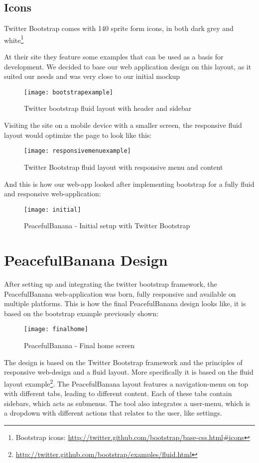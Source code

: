 \subsection{Icons}
Twitter Bootstrap comes with 140 sprite form icons, in both dark grey and white\footnote{Bootstrap icons: \url{http://twitter.github.com/bootstrap/base-css.html\#icons}} 

\newpage
At their site they feature some examples that can be used as a basis for development. We decided to base our web application design on this layout, as it suited our needs and was very close to our initial mockup
\begin{figure}[h!]
\label{bootstrapexample}
\centering
	\texttt{[image: bootstrapexample]}
\caption{Twitter bootstrap fluid layout with header and sidebar}
\end{figure}

Visiting the site on a mobile device with a smaller screen, the responsive fluid layout would optimize the page to look like this:
\begin{figure}[h!]
\label{bootstrapresponsive}
\centering
	\texttt{[image: responsivemenuexample]}
\caption{Twitter Bootstrap fluid layout with responsive menu and content}
\end{figure}
\newpage
And this is how our web-app looked after implementing bootstrap for a fully fluid and responsive web-application:
\begin{figure}[h!]
\label{teamscreen}
\centering
	\texttt{[image: initial]}
\caption{PeacefulBanana - Initial setup with Twitter Bootstrap}
\end{figure}

\section{PeacefulBanana Design}
After setting up and integrating the twitter bootstrap framework, the PeacefulBanana web-application was born, fully responsive and available on multiple platforms. This is how the final PeacefulBanana design looks like, it is based on the bootstrap example previously shown:
\begin{figure}[h!]
\label{finalhome}
\centering
	\texttt{[image: finalhome]}
\caption{PeacefulBanana - Final home screen}
\end{figure}
The design is based on the Twitter Bootstrap framework and the principles of responsive web-design and a fluid layout. More specifically it is based on the fluid layout example\footnote{\url{http://twitter.github.com/bootstrap/examples/fluid.html}}. The PeacefulBanana layout features a navigation-menu on top with different tabs, leading to different content. Each of these tabs contain sidebars, which acts as submenus. The tool also integrates a user-menu, which is a dropdown with different actions that relates to the user, like settings. 

